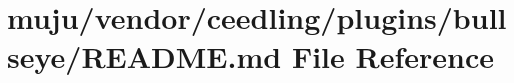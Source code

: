 \hypertarget{vendor_2ceedling_2plugins_2bullseye_2_r_e_a_d_m_e_8md}{}\section{muju/vendor/ceedling/plugins/bullseye/\+R\+E\+A\+D\+ME.md File Reference}
\label{vendor_2ceedling_2plugins_2bullseye_2_r_e_a_d_m_e_8md}
